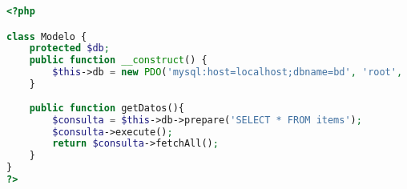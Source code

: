 \begin{lstlisting}[label=mvc_modelo,caption=Clase Modelo,language=PHP]
<?php

class Modelo {
	protected $db;
	public function __construct() {
		$this->db = new PDO('mysql:host=localhost;dbname=bd', 'root', 'password');	
	}
	
	public function getDatos(){
		$consulta = $this->db->prepare('SELECT * FROM items');
		$consulta->execute();
		return $consulta->fetchAll();
	}
}
?>
\end{lstlisting}
